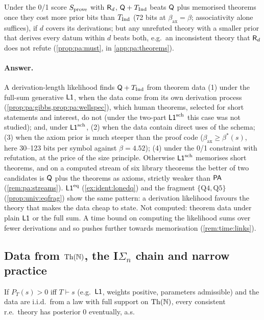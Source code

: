 \noindent Under the 0/1 score $S_{\mathrm{prove}}$ with $\mathsf{R}_{d}$, $\mathsf{Q}+T_{\mathrm{Ind}}$ beats $\mathsf{Q}$ plus memorised theorems once they cost more prior bits than $T_{\mathrm{Ind}}$ (72 bits at $\beta_{\mathrm{ax}}=\beta$; associativity alone suffices), if $d$ covers its derivations; but any unrefuted theory with a smaller prior that derives every datum within $d$ beats both, e.g.\ an inconsistent theory that $\mathsf{R}_{d}$ does not refute (\cref{prop:pa:must}, in \cref{app:pa:theorems}).

\paragraph{Answer.} A derivation-length likelihood finds $\mathsf{Q}+T_{\mathrm{Ind}}$ from theorem data (1) under the full-sum generative $\mathord{\mathsf{L1}}$, when the data come from its own derivation process (\cref{prop:pa:gibbs,prop:pa:wellspec}), which human theorems, selected for short statements and interest, do not (under the two-part $\mathord{\mathsf{L1}}^{\mathrm{sch}}$ this case was not studied); and, under $\mathord{\mathsf{L1}}^{\mathrm{sch}}$, (2) when the data contain direct uses of the schema; (3) when the axiom prior is much steeper than the proof code ($\beta_{\mathrm{ax}}\ge\beta^*(s)$, here 30--123 bits per symbol against $\beta=4.52$); (4) under the 0/1 constraint with refutation, at the price of the size principle. Otherwise $\mathord{\mathsf{L1}}^{\mathrm{sch}}$ memorises short theorems, and on a computed stream of six library theorems the better of two candidates is $\mathsf{Q}$ plus the theorems as axioms, strictly weaker than $\mathsf{PA}$ (\cref{rem:pa:streams}). $\mathord{\mathsf{L1}}^{\mathrm{eq}}$ (\cref{ex:ident:lonedq}) and the fragment $\{\mathrm{Q4},\mathrm{Q5}\}$ (\cref{prop:univ:eqfrag}) show the same pattern: a derivation likelihood favours the theory that makes the data cheap to state. Not computed: theorem data under plain $\mathord{\mathsf{L1}}$ or the full sum. A time bound on computing the likelihood sums over fewer derivations and so pushes further towards memorisation (\cref{rem:time:links}).

\subsection{Data from \texorpdfstring{$\mathrm{Th}(\mathbb{N})$}{Th(N)}, the I\texorpdfstring{$\Sigma_n$}{Sigma-n} chain and narrow practice}\label{sec:pa:thn}

\begin{proposition}\pabrk{}\label{prop:pa:thn}
If $P_T(s)>0$ iff $T\vdash s$ (e.g.\ $\mathord{\mathsf{L1}}$, weights positive, parameters admissible) and the data are i.i.d.\ from a law with full support on $\mathrm{Th}(\mathbb{N})$, every consistent r.e.\ theory has posterior $0$ eventually, a.s.
\end{proposition}

